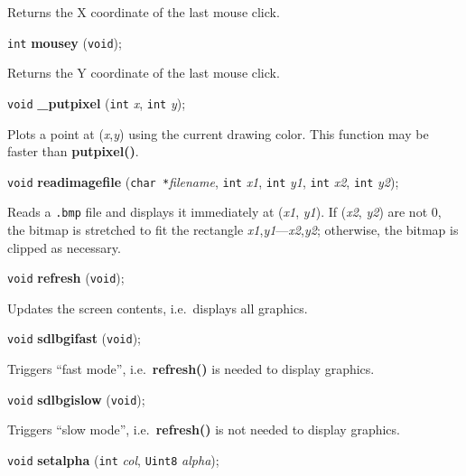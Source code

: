 \documentclass[a4paper,11pt]{article}
\newcommand{\V}{\texttt{void}}      %
\newcommand{\I}{\texttt{int}}       %
\newcommand{\Ue}{\texttt{Uint8}}    %
\newcommand{\C}{\texttt{char *}}    %
\newcommand{\func}[1]{\textbf{#1}}  %
\newcommand{\A}[1]{\emph{#1}}       %
\newcommand{\F}[1]{\texttt{#1}}     %
\newenvironment{bgi}
{ %
  \begin{snugshade}
}
{ %
  \end{snugshade}
}
\begin{document}
Returns the X coordinate of the last mouse click.


\begin{bgi}
\I{} \func{mousey} (\V{});
\end{bgi}

Returns the Y coordinate of the last mouse click.


\begin{bgi}
\V{} \func{\_putpixel} (\I{} \A{x}, \I{} \A{y}); 
\end{bgi}

Plots a point at (\A{x},\A{y}) using the current drawing color. This
function may be faster than \func{putpixel()}.


\begin{bgi}
\V{} \func{readimagefile} (\C{}\A{filename}, \I{} \A{x1}, \I{} \A{y1}, 
\I{} \A{x2}, \I{} \A{y2});
\end{bgi}

Reads a \F{.bmp} file and displays it immediately at (\A{x1}, \A{y1}).
If (\A{x2}, \A{y2}) are not 0, the bitmap is stretched to fit the
rectangle \A{x1},\A{y1}---\A{x2},\A{y2}; otherwise, the bitmap is
clipped as necessary.


\begin{bgi}
\V{} \func{refresh} (\V{}); 
\end{bgi}

Updates the screen contents, i.e.\ displays all graphics.


\begin{bgi}
\V{} \func{sdlbgifast} (\V{}); 
\end{bgi}

Triggers ``fast mode'', i.e.\ \func{refresh()} is needed to display
graphics.


\begin{bgi}
\V{} \func{sdlbgislow} (\V{}); 
\end{bgi}

Triggers ``slow mode'', i.e.\ \func{refresh()} is not needed to
display graphics.


\begin{bgi}
\V{} \func{setalpha} (\I{} \A{col}, \Ue{} \A{alpha}); 
\end{bgi}
\end{document}
